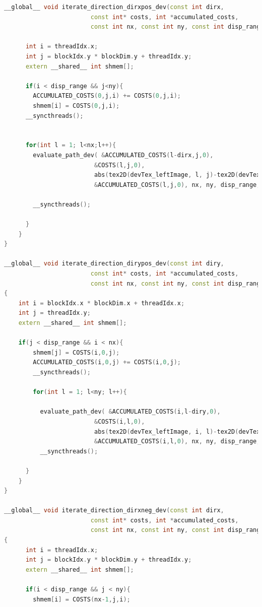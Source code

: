 \documentclass[pdftex,12pt,a4paper]{report}
\begin{document}
  \begin{lstlisting}[language=c++, basicstyle=\scriptsize]
__global__ void iterate_direction_dirxpos_dev(const int dirx,
                        const int* costs, int *accumulated_costs,
                        const int nx, const int ny, const int disp_range ){

      int i = threadIdx.x;
      int j = blockIdx.y * blockDim.y + threadIdx.y;
      extern __shared__ int shmem[];

      if(i < disp_range && j<ny){
        ACCUMULATED_COSTS(0,j,i) += COSTS(0,j,i);
        shmem[i] = COSTS(0,j,i);
      __syncthreads();


      for(int l = 1; l<nx;l++){
        evaluate_path_dev( &ACCUMULATED_COSTS(l-dirx,j,0),
                         &COSTS(l,j,0),
                         abs(tex2D(devTex_leftImage, l, j)-tex2D(devTex_leftImage,l-dirx,j)) ,
                         &ACCUMULATED_COSTS(l,j,0), nx, ny, disp_range, i, shmem);

        __syncthreads();

      }
    }
}

__global__ void iterate_direction_dirypos_dev(const int diry,
                        const int* costs, int *accumulated_costs,
                        const int nx, const int ny, const int disp_range )
{
    int i = blockIdx.x * blockDim.x + threadIdx.x;
    int j = threadIdx.y;
    extern __shared__ int shmem[];

    if(j < disp_range && i < nx){
        shmem[j] = COSTS(i,0,j);
        ACCUMULATED_COSTS(i,0,j) += COSTS(i,0,j);
        __syncthreads();

        for(int l = 1; l<ny; l++){

          evaluate_path_dev( &ACCUMULATED_COSTS(i,l-diry,0),
                         &COSTS(i,l,0),
                         abs(tex2D(devTex_leftImage, i, l)-tex2D(devTex_leftImage,i,l-diry)) ,
                         &ACCUMULATED_COSTS(i,l,0), nx, ny, disp_range, j,shmem);
          __syncthreads();

      }
    }
}

__global__ void iterate_direction_dirxneg_dev(const int dirx,
                        const int* costs, int *accumulated_costs,
                        const int nx, const int ny, const int disp_range )
{
      int i = threadIdx.x;
      int j = blockIdx.y * blockDim.y + threadIdx.y;
      extern __shared__ int shmem[];

      if(i < disp_range && j < ny){
        shmem[i] = COSTS(nx-1,j,i);


\end{lstlisting}
\end{document}
